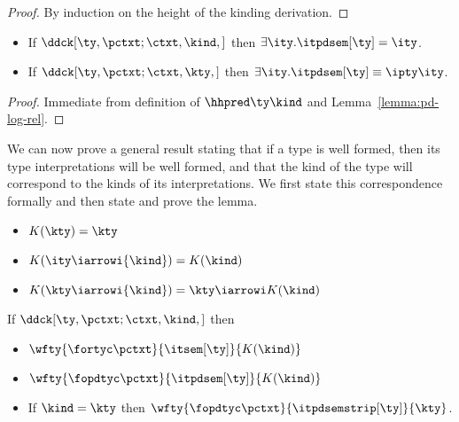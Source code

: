 \begin{proof}
  By induction on the height of the kinding derivation. 
\end{proof}

\begin{corollary}
\label{cor:pd-props}
  \begin{itemize}
  \item If $\ddck[\ty,\pctxt;\ctxt,\kind,{}]$ then $\exists
     \ity.\itpdsem[\ty] = \ity$.
   \item If $\ddck[\ty,\pctxt;\ctxt,\kty,{}]$ then $\exists
     \ity.\itpdsem[\ty] \equiv \ipty \ity$.
  \end{itemize}
\end{corollary}

\begin{proof}
  Immediate from definition of $\hhpred \ty \kind$ and
  Lemma~\ref{lemma:pd-log-rel}.
\end{proof}

We can now prove a general result stating that if a type is well
formed, then its type interpretations will be well formed, and that
the kind of the type will correspond to the kinds of its
interpretations. We first state this correspondence formally and then
state and prove the lemma.

\begin{definition}
\begin{itemize}
\item $K(\kty)        = \kty$
\item $K(\ity \iarrowi {\kind}) = K(\kind)$
\item $K(\kty \iarrowi {\kind}) = \kty \iarrowi K(\kind)$
\end{itemize}
\end{definition}

\begin{lemma}
If $\ddck[\ty,\pctxt;\ctxt,\kind,]$ then 
\begin{itemize}
\item $\wfty{\fortyc \pctxt}{\itsem[\ty]}{K(\kind)}$
\item $\wfty{\fopdtyc \pctxt}{\itpdsem[\ty]}{K(\kind)}$
\item If $\kind = \kty$ then $\wfty {\fopdtyc \pctxt}{\itpdsemstrip[\ty]}{\kty}$.
\end{itemize}
\label{lemma:rep-ty-well-form}
\end{lemma}

